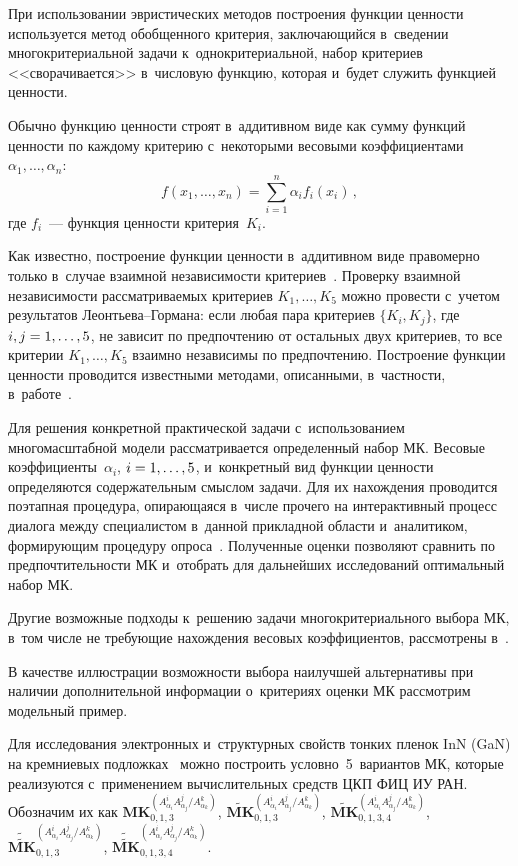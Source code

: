\begin{multicols}{2}
   При использовании эвристических методов построения функции ценности 
используется метод обобщенного критерия, заключающийся в~сведении 
многокритериальной задачи к~однокритериальной, набор критериев 
<<сворачивается>> в~числовую функцию, которая и~будет служить функцией 
ценности.
   
   Обычно функцию ценности строят в~аддитивном виде как сумму функций 
ценности по каждому критерию с~некоторыми весовыми коэффициентами 
$\alpha_1, \ldots , \alpha_n$:
   $$
   f(x_1,\ldots , x_n)=\sum\limits^n_{i=1} \alpha_i f_i(x_i)\,,
   $$
где $f_i$~--- функция ценности критерия~$K_i$.
   
   Как известно, построение функции ценности в~аддитивном виде правомерно 
только в~случае взаимной независимости критериев~\cite{8-ab}. Проверку 
взаимной независимости рассматриваемых критериев $K_1, \ldots , K_5$ можно 
провести с~учетом результатов Ле\-онть\-ева--Гор\-ма\-на: если любая пара 
критериев $\{K_i, K_j\}$, где~$i, j \hm= 1,\ldots ,5$, не зависит по предпочтению 
от остальных двух критериев, то все критерии $K_1,\ldots , K_5$ взаимно 
независимы по предпочтению. Построение функции ценности проводится 
известными методами, описанными, в~частности, в~работе~\cite{6-ab}.
   
   Для решения конкретной практической задачи с~использованием 
многомасштабной модели рассматривается определенный набор 
МК. Весовые коэффициенты~$\alpha_i$, $i\hm=1,\ldots 
,5$, и~конкретный вид функции ценности определяются содержательным смыслом 
задачи. Для их нахождения проводится поэтапная процедура, опирающаяся 
в~числе прочего на интерактивный процесс диалога между специалистом 
в~данной прикладной области и~аналитиком, формирующим процедуру 
опроса~\cite{6-ab, 9-ab}. Полученные оценки позволяют сравнить по 
предпочтительности МК и~отобрать для дальнейших 
исследований оптимальный набор МК.
   
   Другие возможные подходы к~решению задачи многокритериального выбора 
МК, в~том числе не требующие нахождения весовых коэффициентов, 
рассмотрены в~\cite{7-ab, 9-ab, 10-ab}.
   
   В качестве иллюстрации возможности выбора наилучшей альтернативы при 
наличии дополнительной информации о~критериях оценки 
МК рассмотрим модельный пример.
   
   Для исследования электронных и~структурных свойств тонких пленок InN 
(GaN) на кремниевых подложках~\cite{1-ab} можно построить 
условно~5~вариантов МК, которые реализуются 
с~применением вычислительных средств ЦКП ФИЦ ИУ РАН. Обозначим их как
   $\mathbf{MK}_{0,1,3}^{(A^i_{\alpha_i} A^j_{\alpha_j}/A^k_{\alpha_k})}$, 
   $\widetilde{\mathbf{MK}}_{0,1,3}^{(A^i_{\alpha_i} 
A^j_{\alpha_j}/A^k_{\alpha_k})}$,
   $\widetilde{\mathbf{MK}}_{0,1,3,4}^{(A^i_{\alpha_i} 
A^j_{\alpha_j}/A^k_{\alpha_k})}$\hspace*{-2pt},
   $\widetilde{\widetilde{\mathbf{MK}}}_{0,1,3}^{(A^i_{\alpha_i} 
A^j_{\alpha_j}/A^k_{\alpha_k})}$\hspace*{-2pt},
   $\widetilde{\widetilde{\mathbf{MK}}}_{0,1,3,4}^{(A^i_{\alpha_i} 
A^j_{\alpha_j}/A^k_{\alpha_k})}$\hspace*{-2pt}.
   

\end{multicols}
